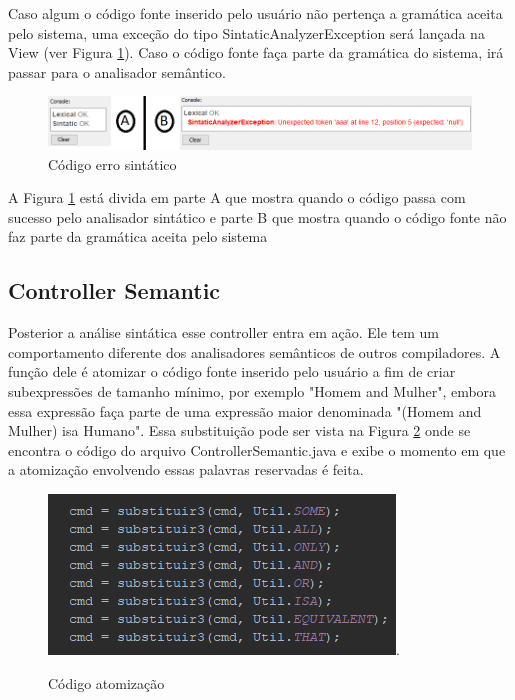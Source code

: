 \documentclass{bcc}
\begin{document}
Caso algum o código fonte inserido pelo usuário não pertença a gramática aceita pelo sistema, uma exceção do tipo SintaticAnalyzerException será lançada na View (ver Figura \ref{fig:codigoErroSintatico}). Caso o código fonte faça parte da gramática do sistema, irá passar para o analisador semântico.

\begin{figure}[H]
\centering
\includegraphics[width=.7\textwidth]{Figuras/codigo_erro_sintatico.png}
\caption{Código erro sintático}
\label{fig:codigoErroSintatico}
\end{figure}

A Figura \ref{fig:codigoErroSintatico} está divida em parte A que mostra quando o código passa com sucesso pelo analisador sintático e parte B que mostra quando o código fonte não faz parte da gramática aceita pelo sistema

\subsection{Controller Semantic}

Posterior a análise sintática esse controller entra em ação. Ele tem um comportamento diferente dos analisadores semânticos de outros compiladores. A função dele é atomizar o código fonte inserido pelo usuário a fim de criar subexpressões de tamanho mínimo, por exemplo "Homem and Mulher", embora essa expressão faça parte de uma expressão maior denominada "(Homem and Mulher) isa Humano". Essa substituição pode ser vista na Figura \ref{fig:codigoAtomizacao} onde se encontra o código do arquivo ControllerSemantic.java e exibe o momento em que a atomização envolvendo essas palavras reservadas é feita. 

\begin{figure}[H]
\centering
\includegraphics[width=.7\textwidth]{Figuras/codigo_atomizacao.png}.
\caption{Código atomização}
\label{fig:codigoAtomizacao}
\end{figure}
\end{document}
